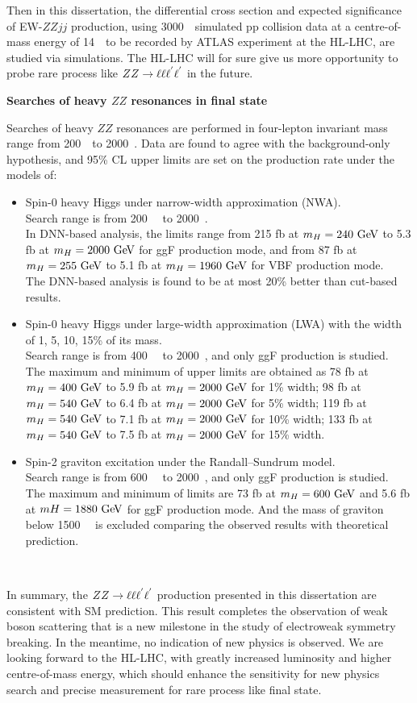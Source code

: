 Then in this dissertation, the differential cross section and expected significance of EW-$ZZjj$ production, 
using 3000~\ifb~simulated pp collision data at a centre-of-mass energy of 14~\tev~to be recorded by ATLAS experiment at the HL-LHC,
are studied via simulations.
The HL-LHC will for sure give us more opportunity to probe rare process like $ZZ \rightarrow \ell\ell\ell^{'}\ell^{'}$ in the future.

\textbf{Searches of heavy $ZZ$ resonances in \llll final state}

Searches of heavy $ZZ$ resonances are performed in four-lepton invariant mass \mfl range from 200~\gev~to 2000~\gev.
Data are found to agree with the background-only hypothesis, and 95\% CL upper limits are set on the production rate under the models of:
\begin{itemize}
	\item Spin-0 heavy Higgs under narrow-width approximation (NWA). \\
Search range is from 200~\gev~ to 2000~\gev.\\
In DNN-based analysis, the limits range from 215 fb at $m_{H} = 240~\text{Ge\kern -0.1em V}$ to 5.3 fb at $m_{H} = 2000~\text{Ge\kern -0.1em V}$ for ggF production mode,
and from 87 fb at $m_{H} = 255~\text{Ge\kern -0.1em V}$ to 5.1 fb at $m_{H} = 1960~\text{Ge\kern -0.1em V}$ for VBF production mode.\\
The DNN-based analysis is found to be at most 20\% better than cut-based results.
	\item Spin-0 heavy Higgs under large-width approximation (LWA) with the width of 1, 5, 10, 15\% of its mass.\\
Search range is from 400~\gev~ to 2000~\gev, and only ggF production is studied.\\
The maximum and minimum of upper limits are obtained as 78 fb at $m_{H} = 400~\text{Ge\kern -0.1em V}$ to 5.9 fb at $m_{H} = 2000~\text{Ge\kern -0.1em V}$ for 1\% width;
98 fb at $m_{H} = 540~\text{Ge\kern -0.1em V}$ to 6.4 fb at $m_{H} = 2000~\text{Ge\kern -0.1em V}$ for 5\% width;
119 fb at $m_{H} = 540~\text{Ge\kern -0.1em V}$ to 7.1 fb at $m_{H} = 2000~\text{Ge\kern -0.1em V}$ for 10\% width;
133 fb at $m_{H} = 540~\text{Ge\kern -0.1em V}$ to 7.5 fb at $m_{H} = 2000~\text{Ge\kern -0.1em V}$ for 15\% width.
	\item Spin-2 graviton excitation under the Randall–Sundrum model.\\
Search range is from 600~\gev~ to 2000~\gev, and only ggF production is studied.\\
The maximum and minimum of limits are 73 fb at $m_{H} = 600~\text{Ge\kern -0.1em V}$ and 5.6 fb at $mH = 1880~\text{Ge\kern -0.1em V}$ for ggF production mode.
And the mass of graviton below 1500~\gev~ is excluded comparing the observed results with theoretical prediction.
\end{itemize}
~~

In summary, the $ZZ \rightarrow \ell\ell\ell^{'}\ell^{'}$ production presented in this dissertation are consistent with SM prediction.
This result completes the observation of weak boson scattering that is a new milestone in the study of electroweak symmetry breaking.
In the meantime, no indication of new physics is observed.
We are looking forward to the HL-LHC, with greatly increased luminosity and higher centre-of-mass energy, 
which should enhance the sensitivity for new physics search and precise measurement for rare process like \llll final state.
